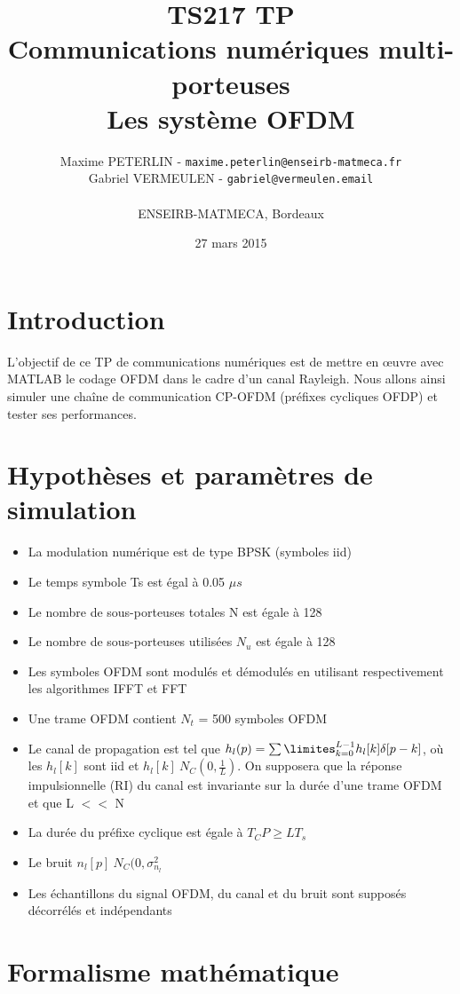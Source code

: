 \documentclass[11pt]{article}
\title{\textbf{TS217 TP}\\Communications numériques multi-porteuses\\Les système OFDM}
\author{Maxime PETERLIN - \texttt{maxime.peterlin@enseirb-matmeca.fr}\\
Gabriel VERMEULEN - \texttt{gabriel@vermeulen.email} \\\\{ENSEIRB-MATMECA, Bordeaux}}
\date{27 mars 2015}
\begin{document}
\maketitle
\tableofcontents

\newpage

\section{Introduction}

L'objectif de ce TP de communications numériques est de mettre en œuvre avec MATLAB le codage OFDM dans le cadre d'un canal Rayleigh. Nous allons ainsi simuler une chaîne de communication CP-OFDM (préfixes cycliques OFDP) et tester ses performances.

	\section{Hypothèses et paramètres de simulation}
		
		\begin{itemize}
			\item La modulation numérique est de type BPSK (symboles iid)
			\item Le temps symbole Ts est égal à 0.05 $\mu s$
			\item Le nombre de sous-porteuses totales N est égale à 128
			\item Le nombre de sous-porteuses utilisées $N_u$ est égale à 128
			\item Les symboles OFDM sont modulés et démodulés en utilisant respectivement les algorithmes IFFT et FFT
			\item Une trame OFDM contient $N_t$ = 500 symboles OFDM
			\item Le canal de propagation est tel que $h_l(p) = \sum\limites_{k=0}^{L-1} h_l[k] \delta [p-k]$, où les $h_l[k]$ sont iid et $h_l[k] ~ N_C(0, \frac{1}{L})$. On supposera que la réponse impulsionnelle (RI) du canal est invariante sur la durée d'une trame OFDM et que L $<<$ N
			\item La durée du préfixe cyclique est égale à $T_CP \geq LT_s$
			\item Le bruit $n_l[p] ~ N_C(0, \sigma_{n_l}^2$
			\item Les échantillons du signal OFDM, du canal et du bruit sont supposés décorrélés et indépendants
		\end{itemize}

	\section{Formalisme mathématique}
	
\end{document}
